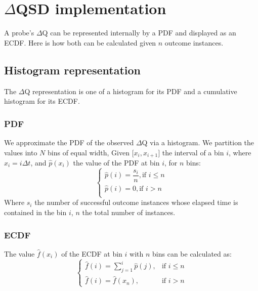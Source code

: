 \section{$\Delta$QSD implementation}
    A probe's $\Delta$Q can be represented internally by a PDF and displayed as an ECDF. Here is how both can be calculated given $n$ outcome instances.
    
    \subsection{Histogram representation}
        The $\Delta$Q representation is one of a histogram for its PDF and a cumulative histogram for its ECDF.
    \subsubsection{PDF}
  We approximate the PDF of the observed $\Delta$Q via a histogram. We partition the values into $N$ bins of equal width, Given $\lbrack x_i, x_{i+1} \rbrack$ the interval of a bin $i$, where $x_i = i\Delta t$, and $\hat{p}(x_i)$ the value of the PDF at bin $i$, for $n$ bins:
        \begin{equation}
            \begin{cases}
                \hat{p}(i) = \dfrac{s_i}{n}, \text{if } i \le n \\
                \hat{p}(i) = 0, \text{if } i > n \\
            \end{cases}
            \label{eq:pdf}
        \end{equation}
    Where $s_i$ the number of successful outcome instances whose elapsed time is contained in the bin $i$, $n$ the total number of instances. \cite{stat}

    \subsubsection{ECDF}
        The value $\hat{f}(x_i)$ of the ECDF at bin $i$ with $n$ bins can be calculated as:
        \begin{equation}
            \begin{cases}
                \hat{f}(i) = \sum_{j=1}^{i} \hat{p}(j), & \text{if } i \le n \\  
                \hat{f}(i) = \hat{f}(x_n), & \text{if } i > n 
            \end{cases}
            \label{eq:cdf}
        \end{equation}
 
